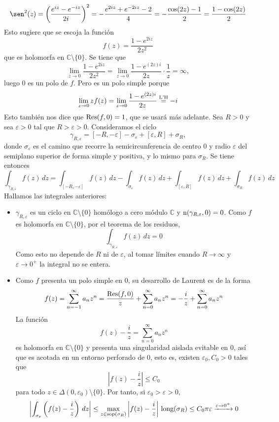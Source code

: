 \documentclass[11pt]{report}
\makeatletter
\renewenvironment{proof}[1][\proofname]{\par
  \pushQED{\qed}%
  \normalfont \topsep\z@skip %
  \trivlist
  \item[\hskip\labelsep
        \itshape
    #1\@addpunct{.}]\ignorespaces
}{%
  \popQED\endtrivlist\@endpefalse
}
\newcommand{\C}{\mathbb C}
\makeatother
\begin{document}
\begin{proof}
\begin{enumerate}
\[\sen^2(z) = \left(\frac{e^{iz}-e^{-iz}}{2i}\right)^2 = -\frac{e^{2iz}+e^{-2iz} -2}{4} = -\frac{\cos(2z)-1}{2} = \frac{1-\cos(2z)}{2}\]
Esto sugiere que se escoja la función
\[f(z)=\frac{1-e^{2iz}}{2z^2}\]
que es holomorfa en $\C \setminus \{0\}$. Se tiene que
\[\lim_{z \to 0} \frac{1-e^{2iz}}{2z^2} = \lim_{z \to 0} \frac{1-e^{(2z)i}}{2z} \cdot \frac{1}{z} = \infty,\]
luego $0$ es un polo de $f$. Pero es un polo simple porque
\[\lim_{z \to 0} zf(z)=\lim_{z \to 0} \frac{1-e^{(2z)i}}{2z}  \overset{\textup{L'H}}{=} -i\]
Esto también nos dice que $\textup{Res}(f,0) = 1$, que se usará más adelante. Sea $R>0$ y sea $\varepsilon>0$ tal que $R>\varepsilon>0$. Consideramos el ciclo
\[\gamma_{R,\varepsilon} = [-R,-\varepsilon]-\sigma_\varepsilon+[\varepsilon,R] + \sigma_R,\]
donde $\sigma_\varepsilon$ es el camino que recorre la semicircunferencia de centro $0$ y radio $\varepsilon$ del semiplano superior de forma simple y positiva, y lo mismo para $\sigma_R$. Se tiene entonces
\[\int_{\gamma_{R,\varepsilon}} f(z) \, dz = \int_{[-R,-\varepsilon]}f(z)\, dz-\int_{\sigma_\varepsilon} f(z) \, dz +\int_{[\varepsilon,R]}f(z) \, dz + \int_{\sigma_R} f(z) \, dz\]
Hallamos las integrales anteriores:
\begin{itemize}
  \item $\gamma_{R,\varepsilon}$ es un ciclo en $\C \setminus \{0\}$ homólogo a cero módulo $\C$ y $\textup{n}(\gamma_{R,\varepsilon},0) = 0$. Como $f$ es holomorfa en $\C \setminus \{0\}$, por el teorema de los residuos,
  \[\int_{\gamma_{R,\varepsilon}} f(z) \, dz = 0\]
  Como esto no depende de $R$ ni de $\varepsilon$, al tomar límites cuando $R \to \infty$ y $\varepsilon \to 0^+$ la integral no se entera.
  \item Como $f$ presenta un polo simple en $0$, su desarrollo de Laurent es de la forma
  \[f(z)=\sum_{n=-1}^\infty a_nz^n = \frac{\textup{Res}(f,0)}{z}+\sum_{n=0}^\infty a_nz^n=-\frac{i}{z}+\sum_{n=0}^\infty a_nz^n\]
  La función
  \[f(z)-\frac{i}{z} = \sum_{n=0}^\infty a_nz^n\]  
  es holomorfa en $\C \setminus \{0\}$ y presenta una singularidad aislada evitable en $0$, así que es acotada en un entorno perforado de $0$, esto es, existen $\varepsilon_0,C_0>0$ tales que
  \[\left|f(z)-\frac{i}{z}\right| \leq C_0\]
  para todo $z \in \Delta(0,\varepsilon_0) \setminus \{0\}$. Por tanto, si $\varepsilon_0>\varepsilon>0$,
  \[\left|\int_{\sigma_\varepsilon}\left(f(z)-\frac{i}{z}\right)\, dz \right| \leq \max_{z \in \textup{sop}(\sigma_R)} \left|f(z)-\frac{i}{z}\right| \, \textup{long}(\sigma_R) \leq C_0\pi \varepsilon \xrightarrow[]{\varepsilon \to 0^+} 0\]

\end{itemize}
\end{enumerate}
\end{proof}
\end{document}
